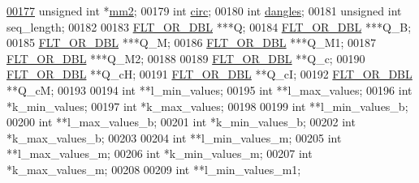\begin{DoxyCode}
\hyperlink{structTwoDpfold__vars_affb913470783f9edb12a0bfc22466269}{00177}   \textcolor{keywordtype}{unsigned} \textcolor{keywordtype}{int}          *\hyperlink{structTwoDpfold__vars_affb913470783f9edb12a0bfc22466269}{mm2};           
00179   \textcolor{keywordtype}{int}                   \hyperlink{group__model__details_gaf9202a1a09f5828dc731e2d9a10fa111}{circ};
00180   \textcolor{keywordtype}{int}                   \hyperlink{group__model__details_ga72b511ed1201f7e23ec437e468790d74}{dangles};
00181   \textcolor{keywordtype}{unsigned} \textcolor{keywordtype}{int}          seq\_length;
00182 
00183   \hyperlink{group__data__structures_ga31125aeace516926bf7f251f759b6126}{FLT\_OR\_DBL}            ***Q;
00184   \hyperlink{group__data__structures_ga31125aeace516926bf7f251f759b6126}{FLT\_OR\_DBL}            ***Q\_B;
00185   \hyperlink{group__data__structures_ga31125aeace516926bf7f251f759b6126}{FLT\_OR\_DBL}            ***Q\_M;
00186   \hyperlink{group__data__structures_ga31125aeace516926bf7f251f759b6126}{FLT\_OR\_DBL}            ***Q\_M1;
00187   \hyperlink{group__data__structures_ga31125aeace516926bf7f251f759b6126}{FLT\_OR\_DBL}            ***Q\_M2;
00188 
00189   \hyperlink{group__data__structures_ga31125aeace516926bf7f251f759b6126}{FLT\_OR\_DBL}            **Q\_c;
00190   \hyperlink{group__data__structures_ga31125aeace516926bf7f251f759b6126}{FLT\_OR\_DBL}            **Q\_cH;
00191   \hyperlink{group__data__structures_ga31125aeace516926bf7f251f759b6126}{FLT\_OR\_DBL}            **Q\_cI;
00192   \hyperlink{group__data__structures_ga31125aeace516926bf7f251f759b6126}{FLT\_OR\_DBL}            **Q\_cM;
00193 
00194   \textcolor{keywordtype}{int}                   **l\_min\_values;
00195   \textcolor{keywordtype}{int}                   **l\_max\_values;
00196   \textcolor{keywordtype}{int}                   *k\_min\_values;
00197   \textcolor{keywordtype}{int}                   *k\_max\_values;
00198 
00199   \textcolor{keywordtype}{int}                   **l\_min\_values\_b;
00200   \textcolor{keywordtype}{int}                   **l\_max\_values\_b;
00201   \textcolor{keywordtype}{int}                   *k\_min\_values\_b;
00202   \textcolor{keywordtype}{int}                   *k\_max\_values\_b;
00203 
00204   \textcolor{keywordtype}{int}                   **l\_min\_values\_m;
00205   \textcolor{keywordtype}{int}                   **l\_max\_values\_m;
00206   \textcolor{keywordtype}{int}                   *k\_min\_values\_m;
00207   \textcolor{keywordtype}{int}                   *k\_max\_values\_m;
00208 
00209   \textcolor{keywordtype}{int}                   **l\_min\_values\_m1;

\end{DoxyCode}
